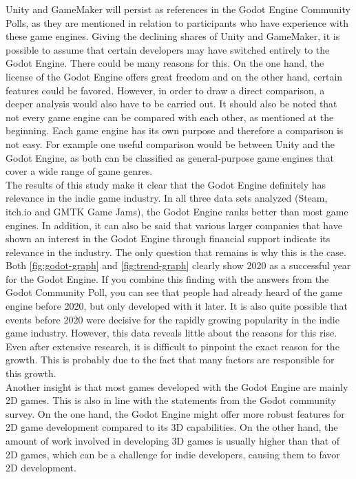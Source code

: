 Unity and GameMaker will persist as references in the Godot Engine Community Polls, as they are mentioned in relation to participants who have experience with these game engines.
Giving the declining shares of Unity and GameMaker, it is possible to assume that certain developers may have switched entirely to the Godot Engine.
There could be many reasons for this.
On the one hand, the license of the Godot Engine offers great freedom and on the other hand, certain features could be favored.
However, in order to draw a direct comparison, a deeper analysis would also have to be carried out.
It should also be noted that not every game engine can be compared with each other, as mentioned at the beginning.
Each game engine has its own purpose and therefore a comparison is not easy.
For example one useful comparison would be between Unity and the Godot Engine, as both can be classified as general-purpose game engines that cover a wide range of game genres.\\

The results of this study make it clear that the Godot Engine definitely has relevance in the indie game industry.
In all three data sets analyzed (Steam, itch.io and GMTK Game Jams), the Godot Engine ranks better than most game engines.
In addition, it can also be said that various larger companies that have shown an interest in the Godot Engine through financial support indicate its relevance in the industry. 
The only question that remains is why this is the case.
Both \autoref{fig:godot-graph} and \autoref{fig:trend-graph} clearly show 2020 as a successful year for the Godot Engine.
If you combine this finding with the answers from the Godot Community Poll, you can see that people had already heard of the game engine before 2020, but only developed with it later.
It is also quite possible that events before 2020 were decisive for the rapidly growing popularity in the indie game industry.
However, this data reveals little about the reasons for this rise. Even after extensive research, it is difficult to pinpoint the exact reason for the growth.
This is probably due to the fact that many factors are responsible for this growth. \\

Another insight is that most games developed with the Godot Engine are mainly 2D games.
This is also in line with the statements from the Godot community survey.
On the one hand, the Godot Engine might offer more robust features for 2D game development compared to its 3D capabilities.
On the other hand, the amount of work involved in developing 3D games is usually higher than that of 2D games, which can be a challenge for indie developers, causing them to favor 2D development. \\

